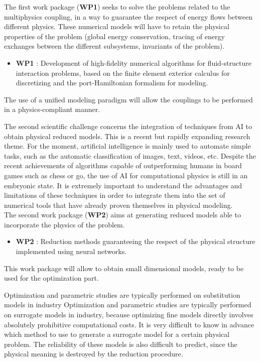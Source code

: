 \documentclass[12pt]{article}
\begin{document}
	The first work package (\textbf{WP1}) seeks to solve the problems related to the multiphysics coupling, in a way to guarantee the respect of energy flows between different physics. These numerical models will have to retain the physical properties of the problem (global energy conservation, tracing of energy exchanges between the different subsystems, invariants of the problem). \\
	
	\begin{itemize}
		\item \textbf{WP1} : Development of high-fidelity numerical algorithms for fluid-structure interaction problems, based on the finite element exterior calculus for discretizing and the port-Hamiltonian formalism for modeling. \\
	\end{itemize}
	
	The use of a unified modeling paradigm will allow the couplings to be performed in a physics-compliant manner.
	
	The second scientific challenge concerns the integration of techniques from AI to obtain physical reduced models. This is a recent but rapidly expanding research theme. For the moment, artificial intelligence is mainly used to automate simple tasks, such as the automatic classification of images, text, videos, etc. Despite the recent achievements of algorithms capable of outperforming humans in board games such as chess or go, the use of AI for computational physics is still in an embryonic state. It is extremely important to understand the advantages and limitations of these techniques in order to integrate them into the set of numerical tools that have already proven themselves in physical modeling. \\
	
	The second work package (\textbf{WP2}) aims at generating reduced models able to incorporate the physics of the problem. \\
	
	\begin{itemize}
		\item \textbf{WP2} : Reduction methods guaranteeing the respect of the physical structure implemented using neural networks.
	\end{itemize}
	
	This work package will allow to obtain small dimensional models, ready to be used for the optimization part. 
	
	Optimization and parametric studies are typically performed on substitution models in industry
	Optimization and parametric studies are typically performed on surrogate models in industry, because optimizing fine models directly involves absolutely prohibitive computational costs. It is very difficult to know in advance which method to use to generate a surrogate model for a certain physical problem. The reliability of these models is also difficult to predict, since the physical meaning is destroyed by the reduction procedure. \\
	
\end{document}

